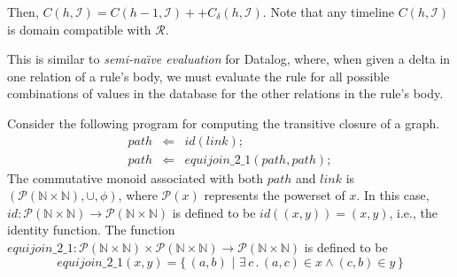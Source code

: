 Then, $ C(h,\mathcal{I}) = C(h-1,\mathcal{I}) ++ C_\delta(h,\mathcal{I})$.
Note that any timeline $C(h,\mathcal{I})$ is domain compatible with $\mathcal{R}$.

This is similar to {\em semi-na\"{\i}ve evaluation} for Datalog, where, when given a delta in one relation of a rule's body, we must evaluate the rule for all possible combinations of values in the database for the other relations in the rule's body.

\begin{example}
Consider the following program for computing the transitive closure of a graph.
\begin{eqnarray*}
  path &\Leftarrow& id(link); \\
  path &\Leftarrow& equijoin\_2\_1(path, path);
\end{eqnarray*}
The commutative monoid associated with both $path$ and $link$ is $(\mathcal{P}(\mathbb{N} \times \mathbb{N}), \cup, \phi)$, where $\mathcal{P}(x)$ represents the powerset of $x$. In this case, $id : \mathcal{P}(\mathbb{N} \times \mathbb{N}) \rightarrow \mathcal{P}(\mathbb{N} \times \mathbb{N})$ is defined to be $id((x,y)) = (x,y)$, i.e., the identity function.  The function $equijoin\_2\_1 : \mathcal{P}(\mathbb{N} \times \mathbb{N}) \times \mathcal{P}(\mathbb{N} \times \mathbb{N}) \rightarrow \mathcal{P}(\mathbb{N} \times \mathbb{N})$ is defined to be 
$$equijoin\_2\_1(x,y) = \{\,(a,b) \,\, | \,\, \exists \, c \, .\,  (a,c) \in x \land (c,b) \in y\,\}$$


\end{example}
